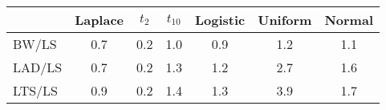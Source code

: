 %
\begin{center}
\begin{tabular}{|l||c|c|c|c|c|c|} \hline
\multicolumn{1}{|l||}{}&\multicolumn{1}{c|}{Laplace}&\multicolumn{1}{c|}{$t_2$}&\multicolumn{1}{c|}{$t_{10}$}&\multicolumn{1}{c|}{Logistic}&\multicolumn{1}{c|}{Uniform}&\multicolumn{1}{c|}{Normal}\\ \hline
BW/LS&0.7&0.2&1.0&0.9&1.2&1.1\\ 
LAD/LS&0.7&0.2&1.3&1.2&2.7&1.6\\ 
LTS/LS&0.9&0.2&1.4&1.3&3.9&1.7\\ 
\hline
\end{tabular}
\end{center}
